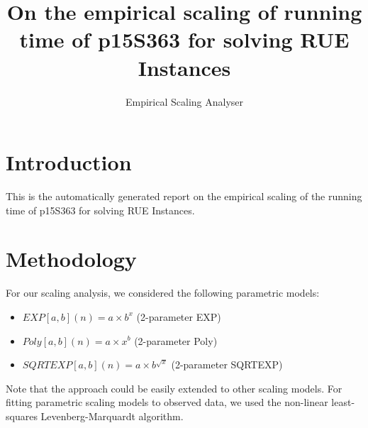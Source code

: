 \providecommand{\tabularnewline}{\\}


\title{On the empirical scaling of running time of p15S363 for solving RUE Instances}
\author{Empirical Scaling Analyser}

\makeatother

\usepackage{babel}

\maketitle %


\section{Introduction}

This is the automatically generated report on the empirical scaling
of the running time of p15S363 for solving RUE Instances.


\section{Methodology}

\label{sec:Methodology}

For our scaling analysis, we considered the following parametric models:
\begin{itemize} 
\item $EXP\left[a,b\right]\left(n\right)=a\times b^{x}$ \quad{}(2-parameter EXP)\item $Poly\left[a,b\right]\left(n\right)=a\times x^{b}$ \quad{}(2-parameter Poly)\item $SQRTEXP\left[a,b\right]\left(n\right)=a\times b^{\sqrt{x}}$ \quad{}(2-parameter SQRTEXP)\end{itemize}
Note that the approach could be easily extended to other scaling models.
For fitting parametric scaling models to observed data, we used the
non-linear least-squares Levenberg-Marquardt algorithm.

